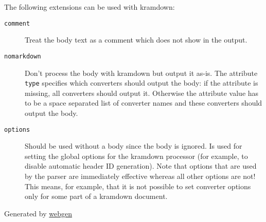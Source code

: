 \documentclass[a4paper]{article}
\begin{document}
The following extensions can be used with kramdown:

\begin{description}
\item[\texttt{comment}]
Treat the body text as a comment which does not show in the output.
\item[\texttt{nomarkdown}]
Don't process the body with kramdown but output it as-is. The attribute
\texttt{type} specifies which converters should output the body: if the
attribute is missing, all converters should output it. Otherwise the
attribute value has to be a space separated list of converter names and
these converters should output the body.
\item[\texttt{options}]
Should be used without a body since the body is ignored. Is used for
setting the global options for the kramdown processor (for example, to
disable automatic header ID generation). Note that options that are used
by the parser are immediately effective whereas all other options are
not! This means, for example, that it is not possible to set converter
options only for some part of a kramdown document.
\end{description}

Generated by \href{http://webgen.gettalong.org}{webgen}
\end{document}
